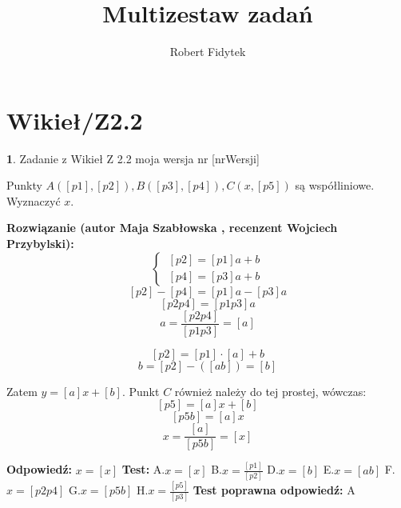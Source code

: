 \documentclass[12pt, a4paper]{article}
\title{Multizestaw zadań}
\author{Robert Fidytek}
\date{}
\theoremstyle{definition} %
\newtheorem{zad}{}
\newcommand{\kategoria}[1]{\section{#1}} %
\newcommand{\zadStart}[1]{\begin{zad}#1\newline} %
\newcommand{\zadStop}{\end{zad}}   %
\newcommand{\rozwStart}[2]{\noindent \textbf{Rozwiązanie (autor #1 , recenzent #2): }\newline} %
\newcommand{\rozwStop}{\newline}                                            %
\newcommand{\odpStart}{\noindent \textbf{Odpowiedź:}\newline}    %
\newcommand{\odpStop}{\newline}                                             %
\newcommand{\testStart}{\noindent \textbf{Test:}\newline} %
\newcommand{\testStop}{\newline} %
\newcommand{\kluczStart}{\noindent \textbf{Test poprawna odpowiedź:}\newline} %
\newcommand{\kluczStop}{\newline} %
\begin{document}
\maketitle


\kategoria{Wikieł/Z2.2}
\zadStart{Zadanie z Wikieł Z 2.2  moja wersja nr [nrWersji]}

Punkty $A([p1],[p2]), B([p3],[p4]), C(x,[p5])$ są współliniowe. Wyznaczyć $x$.
\zadStop

\rozwStart{Maja Szabłowska}{Wojciech Przybylski}
$$\left\{ \begin{array}{ll}
\ [p2]=[p1]a+b\\
\ [p4]=[p3]a+b
\end{array} \right.$$
$$[p2]-[p4]=[p1]a-[p3]a$$
$$[p2p4]=[p1p3]a$$
$$a=\frac{[p2p4]}{[p1p3]}=[a]$$

$$[p2]=[p1]\cdot[a]+b $$
$$b=[p2]-([ab])=[b]$$

Zatem $y=[a]x+[b].$ Punkt $C$ również należy do tej prostej, wówczas:
$$[p5]=[a]x+[b]$$
$$[p5b]=[a]x$$
$$x=\frac{[a]}{[p5b]}=[x]$$
\rozwStop


\odpStart
$x=[x]$
\odpStop
\testStart
A.$x=[x]$
B.$x=\frac{[p1]}{[p2]}$
D.$x=[b]$
E.$x=[ab]$
F.$x=[p2p4]$
G.$x=[p5b]$
H.$x=\frac{[p5]}{[p3]}$
\testStop
\kluczStart
A
\kluczStop
\end{document}
